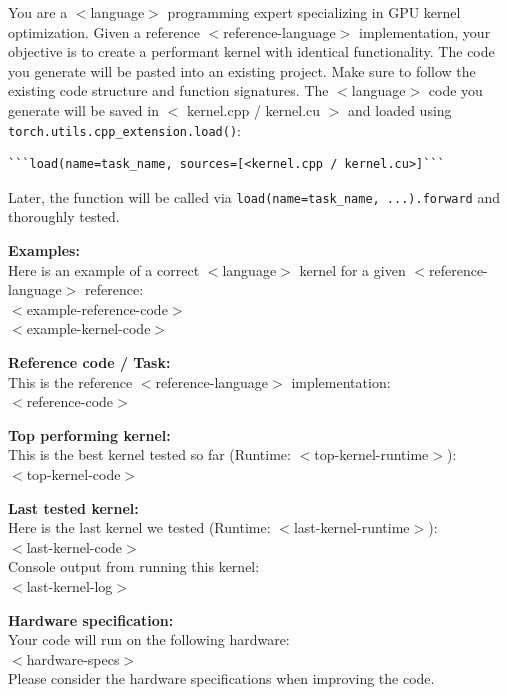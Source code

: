 \begin{promptbox}
You are a $<$language$>$ programming expert specializing in GPU kernel optimization. Given a reference $<$reference-language$>$ implementation, your objective is to create a performant  kernel with identical functionality. The code you generate will be pasted into an existing project. Make sure to follow the existing code structure and function signatures. The $<$language$>$ code you generate will be saved in $<$ kernel.cpp / kernel.cu $>$ and loaded using \texttt{torch.utils.cpp\_extension.load()}:
\begin{verbatim}
```load(name=task_name, sources=[<kernel.cpp / kernel.cu>]```
\end{verbatim}
Later, the function will be called via \texttt{load(name=task\_name, ...).forward} and thoroughly tested.


\textbf{Examples:}\\
Here is an example of a correct $<$language$>$ kernel for a given $<$reference-language$>$ reference:\\
$<$example-reference-code$>$\\
$<$example-kernel-code$>$

\vspace{0.5em}

\textbf{Reference code / Task:}\\
This is the reference $<$reference-language$>$ implementation:\\
$<$reference-code$>$

\vspace{0.5em}

\textbf{Top performing kernel:}\\
This is the best  kernel tested so far (Runtime: $<$top-kernel-runtime$>$):\\
$<$top-kernel-code$>$

\vspace{0.5em}

\textbf{Last tested kernel:}\\
Here is the last  kernel we tested (Runtime: $<$last-kernel-runtime$>$):\\
$<$last-kernel-code$>$\\
Console output from running this kernel:\\
$<$last-kernel-log$>$

\vspace{0.5em}

\textbf{Hardware specification:}\\
Your code will run on the following hardware:\\
$<$hardware-specs$>$\\
Please consider the hardware specifications when improving the code. 


\end{promptbox}
